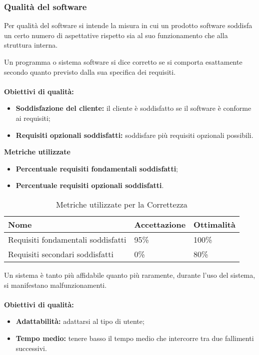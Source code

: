 \subsubsection{Qualità del software}
Per qualità del software si intende la misura in cui un prodotto software soddisfa un certo numero di aspettative rispetto sia al suo funzionamento che alla struttura interna. 

Un programma o sistema software si dice corretto se si comporta esattamente secondo quanto previsto dalla sua specifica dei requisiti.\\\\
\textbf{Obiettivi di qualità:}
\begin{itemize}
	\item \textbf{Soddisfazione del cliente:} il cliente è soddisfatto se il software è conforme ai requisiti;
	\item \textbf{Requisiti opzionali soddisfatti:} soddisfare più requisiti opzionali possibili.\\
\end{itemize}
\textbf{Metriche utilizzate}
\begin{itemize}
	\item \textbf{Percentuale requisiti fondamentali soddisfatti};
	\item \textbf{Percentuale requisiti opzionali soddisfatti}.
\end{itemize}
\begin{table}[!htpb]
	\centering
	\renewcommand{\arraystretch}{2} 
		\begin{tabular}{|l|l|l|}
			\rowcolor{orange!50}
			\hline
			\textbf{Nome} & \textbf{Accettazione} & \textbf{Ottimalità} \\ \hline
			Requisiti fondamentali soddisfatti  &  95\%  &  100\%      \\ \hline
			Requisiti secondari soddisfatti  &   0\% &   80\%     \\ \hline
		\end{tabular}
	\caption{Metriche utilizzate per la Correttezza}
\end{table}
	Un sistema è tanto più affidabile quanto più raramente, durante l'uso del sistema, si manifestano malfunzionamenti.\\\\
\textbf{Obiettivi di qualità:}
\begin{itemize}
	\item \textbf{Adattabilità:} adattarsi al tipo di utente;
	\item \textbf{Tempo medio:} tenere basso il tempo medio che intercorre tra due fallimenti successivi.
\end{itemize}
